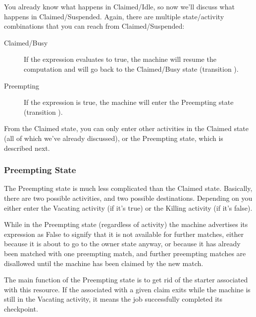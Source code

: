 You already know what happens in Claimed/Idle, so now we'll discuss
what happens in Claimed/Suspended.  Again, there are multiple
state/activity combinations that you can reach from Claimed/Suspended:

\begin{description}
  
\item[Claimed/Busy] If the  expression evaluates to
  true, the machine will resume the computation and will go back to the
  Claimed/Busy state (transition ).

\item[Preempting] If the  expression is true, the machine
  will enter the Preempting state (transition ).

\end{description}

From the Claimed state, you can only enter other activities in the
Claimed state (all of which we've already discussed), or the
Preempting state, which is described next.

\subsubsection{Preempting State}
\label{sec:Preempting-State}

The Preempting state is much less complicated than the Claimed state.
Basically, there are two possible activities, and two possible
destinations.  Depending on  you either enter the
Vacating activity (if it's true) or the Killing activity (if it's
false).  

While in the Preempting state (regardless of activity) the machine
advertises its  expression as False to signify that
it is not available for further matches, either because it is about to go
to the owner state anyway, or because it has already been matched with
one preempting match, and further preempting matches are disallowed
until the machine has been claimed by the new match.

The main function of the Preempting state is to get rid of the starter
associated with this resource.  If the  associated
with a given claim exits while the machine is still in the Vacating
activity, it means the job successfully completed its checkpoint.

